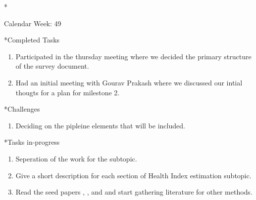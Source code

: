 \documentclass[11pt,a4paper]{article}
\begin{document}
\newpage
\begin{section}*{Calendar Week: 49 \hfill \date{04 December, 2020}}
 \begin{refsection}

       \begin{subsection}*{Completed Tasks}
             \begin{enumerate}
                   \item Participated in the thursday meeting where we decided the primary structure of the survey document.
                   \item Had an initial meeting with Gourav Prakash where we discussed our intial thougts
                         for a plan for milestone 2.
             \end{enumerate}
       \end{subsection}

       \begin{subsection}*{Challenges}
             \begin{enumerate}
                   \item Deciding on the pipleine elements that will be included.
             \end{enumerate}
       \end{subsection}

       \begin{subsection}*{Tasks in-progress}
             \begin{enumerate}
                   \item Seperation of the work for the subtopic.
                   \item Give a short description for each section of Health Index estimation subtopic.
                   \item Read the seed papers \cite{8097036}, \cite{7377088}, and \cite{malhotra2016multisensor} and start gathering literature
                         for other methods.
             \end{enumerate}
       \end{subsection}

       \printbibliography
 \end{refsection}
\end{section}
\end{document}
